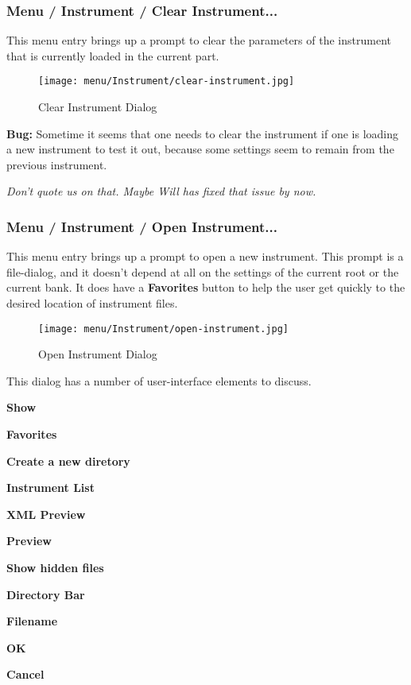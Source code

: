 \subsubsection{Menu / Instrument / Clear Instrument...}
\label{subsubsec:menu_instrument_clear}

   This menu entry brings up a prompt to clear the parameters of the
   instrument that is currently loaded in the current part.

\begin{figure}[H]
   \centering 
   \texttt{[image: menu/Instrument/clear-instrument.jpg]}
   \caption{Clear Instrument Dialog}
   \label{fig:clear_instrument_dialog}
\end{figure}

   \textbf{Bug:}
   Sometime it seems that one needs to clear the instrument if one is
   loading a new instrument to test it out, because some settings seem
   to remain from the previous instrument.

   \textsl{Don't quote us on that.  Maybe Will has fixed that issue by now.}

\subsubsection{Menu / Instrument / Open Instrument...}
\label{subsubsec:menu_instrument_open}

   This menu entry brings up a prompt to open a new instrument.
   This prompt is a file-dialog, and it doesn't depend at all on the settings
   of the current root or the current bank.  It does have a
   \textbf{Favorites} button to help the user get quickly to the desired
   location of instrument files.

\begin{figure}[H]
   \centering 
   \texttt{[image: menu/Instrument/open-instrument.jpg]}
   \caption{Open Instrument Dialog}
   \label{fig:open_instrument_dialog}
\end{figure}

   This dialog has a number of user-interface elements to discuss.

   \begin{enumber}
      \item \textbf{Show}
      \item \textbf{Favorites}
      \item \textbf{Create a new diretory}
      \item \textbf{Instrument List}
      \item \textbf{XML Preview}
      \item \textbf{Preview}
      \item \textbf{Show hidden files}
      \item \textbf{Directory Bar}
      \item \textbf{Filename}
      \item \textbf{OK}
      \item \textbf{Cancel}
   \end{enumber}

